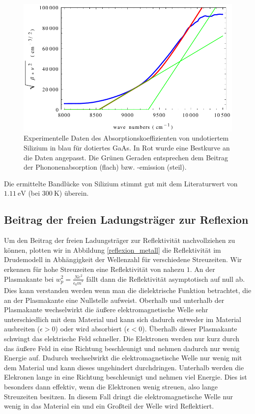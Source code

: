 \documentclass[paper=a4,fontsize=10pt,DIV=18,twocolumn,parskip=half]{scrartcl}
\numberwithin{equation}{section}    %
\begin{document}
\begin{figure}
	\begin{center}
		\includegraphics[width=\columnwidth]{Bilder/phonon_char}
		\caption{Experimentelle Daten des Absorptionskoeffizienten von undotiertem Silizium in blau für dotiertes GaAs. In Rot wurde eine Bestkurve an die Daten angepasst. Die Grünen Geraden entsprechen dem Beitrag der Phononenabsorption (flach) bzw. -emission (steil).}
		\label{phonon_char}
	\end{center}
\end{figure}

Die ermittelte Bandlücke von Silizium stimmt gut mit dem 
Literaturwert von $\SI{1.11}{\eV}$ \cite{kittel} (bei $\SI{300}{\K}$) überein.

\subsection{Beitrag der freien Ladungsträger zur Reflexion}

Um den Beitrag der freien Ladungsträger zur Reflektivität nachvollziehen zu 
können, plotten wir in Abbildung \ref{reflexion_metall} die Reflektivität im Drudemodell in 
Abhängigkeit der Wellenzahl für verschiedene Streuzeiten. Wir erkennen für hohe 
Streuzeiten eine Reflektivität von nahezu $1$. An der Plasmakante bei $ 
w_p^2=\frac{N e^2}{\epsilon_0 m^*}$ fällt dann die Reflektivität asymptotisch 
auf null ab. Dies kann verstanden werden  wenn man die dielektrische Funktion 
betrachtet, die an der Plasmakante eine Nullstelle aufweist. Oberhalb und 
unterhalb der Plasmakante wechselwirkt die äußere elektromagnetische Welle sehr 
unterschiedlich mit dem Material und kann sich dadurch entweder im Material 
ausbreiten ($\epsilon > 0$) oder wird absorbiert ($\epsilon < 0$). Überhalb 
dieser Plasmakante schwingt das elektrische Feld schneller. Die Elektronen 
werden nur kurz durch das äußere Feld in eine Richtung beschleunigt und nehmen 
dadurch nur wenig Energie auf. Dadurch wechselwirkt die elektromagnetische Welle
nur wenig mit dem Material und kann dieses ungehindert durchdringen. Unterhalb 
werden die Elekronen lange in eine Richtung beschleunigt und nehmen viel 
Energie. Dies ist besonders dann effektiv, wenn die Elektronen wenig streuen, 
also lange Streuzeiten besitzen. In diesem Fall dringt die elektromagnetische 
Welle nur wenig in das Material ein und ein Großteil der Welle wird Reflektiert.
\end{document}
